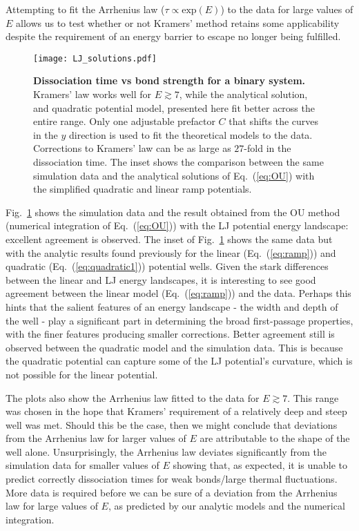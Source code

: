 \documentclass[twocolumn,pre,aps,showpacs,a4paper,floatfix,amssymb]{revtex4-1}
\newcommand{\refeq}[1]{Eq.~(\ref{#1})}
\newcommand{\refig}[1]{Fig.~\ref{#1}}
\begin{document}
Attempting to fit the Arrhenius law ($\tau \propto \text{exp}(E)$) to the data for large values of $E$ allows us to test whether or not Kramers' method retains some applicability despite the requirement of an energy barrier to escape no longer being fulfilled.



\begin{figure}
\texttt{[image: LJ\_solutions.pdf]}
\caption{{\bf Dissociation time vs bond strength for a binary system.} 
Kramers' law works well for $E\gtrsim7$, 
while the analytical solution, and quadratic potential model, presented here fit better across the entire range.
Only one adjustable prefactor $C$ that shifts the curves in the $y$ direction is used to fit the theoretical models to the data.
Corrections to Kramers' law can be as large as $27$-fold in the dissociation time. The inset shows the comparison between the same simulation data and the analytical solutions of \refeq{eq:OU} with the simplified quadratic and linear ramp potentials. 
}
\label{fig:dtime_vs_E}
\end{figure} 

\refig{fig:dtime_vs_E} shows the simulation data and the result obtained from the OU method (numerical integration of \refeq{eq:OU}) with the LJ potential energy landscape: excellent agreement is observed. The inset of \refig{fig:dtime_vs_E} shows the same data but with the analytic results found previously for the linear (\refeq{eq:ramp}) and quadratic (\refeq{eq:quadratic1}) potential wells. Given the stark differences between the linear and LJ energy landscapes, it is interesting to see good agreement between the linear model (\refeq{eq:ramp}) and the data. Perhaps this hints that the salient features of an energy landscape - the width and depth of the well - play a significant part in determining the broad first-passage properties, with the finer features producing smaller corrections. Better agreement still is observed between the quadratic model and the simulation data. This is because the quadratic potential can capture some of the LJ potential's curvature, which is not possible for the linear potential.

The plots also show the Arrhenius law fitted to the data for $E \gtrsim 7$. This range was chosen in the hope that Kramers' requirement of a relatively deep and steep well was met. Should this be the case, then we might conclude that deviations from the Arrhenius law for larger values of $E$ are attributable to the shape of the well alone. Unsurprisingly, the Arrhenius law deviates significantly from the simulation data for smaller values of $E$ showing that, as expected, it is unable to predict correctly dissociation times for weak bonds/large thermal fluctuations. More data is required before we can be sure of a deviation from the Arrhenius law for large values of $E$, as predicted by our analytic models and the numerical integration.
\end{document}
